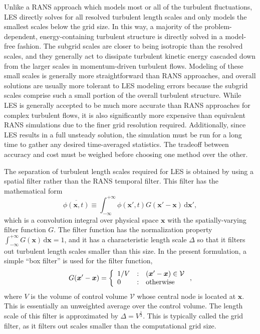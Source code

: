 
Unlike a RANS approach which models most or all of the turbulent
fluctuations, LES directly solves for all resolved turbulent length 
scales and only models the smallest scales below the grid size.  In this
way, a majority of the problem-dependent, energy-containing turbulent
structure is directly solved in a model-free fashion.  The subgrid scales
are closer to being isotropic than the resolved scales, and they generally
act to dissipate turbulent kinetic energy cascaded down from the larger
scales in momentum-driven turbulent flows.  Modeling
of these small scales is generally more straightforward than RANS 
approaches, and overall solutions are usually more tolerant to LES
modeling errors because the subgrid scales comprise such a small portion
of the overall turbulent structure.  While LES is
generally accepted to be much more accurate than RANS approaches for 
complex turbulent flows, it is also significantly more expensive
than equivalent RANS simulations due to the finer grid resolution
required.  Additionally, since LES results in a full unsteady solution,
the simulation must be run for a long time to gather any desired 
time-averaged statistics.  The tradeoff between accuracy and cost 
must be weighed before choosing one method over the other.

The separation of turbulent length scales required for LES is obtained
by using a spatial filter rather than the RANS temporal filter.
This filter has the mathematical form
%
\begin{equation} 
\overline{\phi(\boldsymbol{x},t)} \equiv \int_{-\infty}^{+\infty}
    \phi(\boldsymbol{x}',t) G(\boldsymbol{x}' - \boldsymbol{x})\,
    \mathrm{d}\boldsymbol{x}',
\label{les-filter}
\end{equation}
%
which is a convolution integral over physical space $\boldsymbol{x}$
with the spatially-varying filter function $G$.  The filter function
has the normalization property $\int_{-\infty}^{+\infty}
G(\boldsymbol{x})\, \mathrm{d}\boldsymbol{x} = 1$, and it has a characteristic
length scale $\Delta$ so that it filters out turbulent length scales
smaller than this size.  In the present formulation, a simple ``box filter''
is used for the filter function,
%
\begin{equation}
G(\boldsymbol{x}' - \boldsymbol{x}) = \left\{ \begin{array}{l@{\quad:\quad}l}
    1/V         & (\boldsymbol{x}' - \boldsymbol{x}) \in \mathcal{V} \\
    0           & \mathrm{otherwise} \\
    \end{array} \right.,
\end{equation}
%
where $V$ is the volume of control volume $\mathcal{V}$ whose central 
node is located at $\boldsymbol{x}$.  This is essentially an unweighted
average over the control volume.  The length scale of this filter
is approximated by $\Delta = V^\frac{1}{3}$.  This is typically called 
the grid filter, as it filters out scales smaller than the 
computational grid size.

